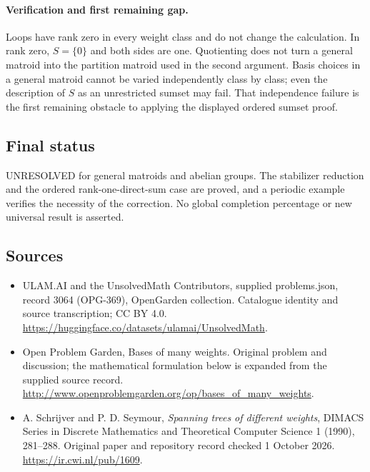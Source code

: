 \documentclass[11pt,a4paper]{article}
\begin{document}
\paragraph{Verification and first remaining gap.}
Loops have rank zero in every weight class and do not change the
calculation. In rank zero, $S=\{0\}$ and both sides are one. Quotienting
does not turn a general matroid into the partition matroid used in the
second argument. Basis choices in a general matroid cannot be varied
independently class by class; even the description of $S$ as an
unrestricted sumset may fail. That independence failure is the first
remaining obstacle to applying the displayed ordered sumset proof.

\subsection{Final status}
UNRESOLVED for general matroids and abelian groups. The stabilizer
reduction and the ordered rank-one-direct-sum case are proved, and a
periodic example verifies the necessity of the correction. No global
completion percentage or new universal result is asserted.

\subsection{Sources}
\begin{itemize}
\item[S1] ULAM.AI and the UnsolvedMath Contributors, supplied problems.json, record 3064 (OPG-369), OpenGarden collection. Catalogue identity and source transcription; CC BY 4.0.
\url{https://huggingface.co/datasets/ulamai/UnsolvedMath}.
\item[S2] Open Problem Garden, Bases of many weights. Original problem and discussion; the mathematical formulation below is expanded from the supplied source record.
\url{http://www.openproblemgarden.org/op/bases_of_many_weights}.
\item[S3] A. Schrijver and P. D. Seymour, \emph{Spanning trees of different weights}, DIMACS Series in Discrete Mathematics and Theoretical Computer Science 1 (1990), 281--288. Original paper and repository record checked 1 October 2026.
\url{https://ir.cwi.nl/pub/1609}.
\end{itemize}
\end{document}
